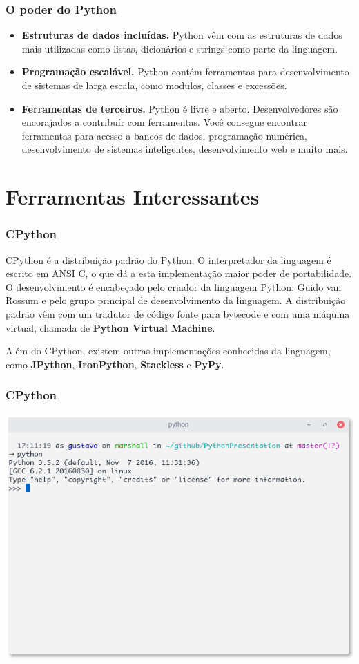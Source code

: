 \documentclass[aspectratio=169]{beamer}
\begin{document}
\begin{frame}
    \frametitle{O poder do Python}
    \begin{itemize}
        \item \textbf{Estruturas de dados incluídas.} Python vêm com as estruturas de
dados mais utilizadas como listas, dicionários e strings como parte da linguagem.
        \item \textbf{Programação escalável.} Python contém ferramentas para desenvolvimento
de sistemas de larga escala, como modulos, classes e excessões.
        \item \textbf{Ferramentas de terceiros.} Python é livre e aberto. Desenvolvedores
são encorajados a contribuír com ferramentas. Você consegue encontrar ferramentas para
acesso a bancos de dados, programação numérica, desenvolvimento de sistemas inteligentes,
desenvolvimento web e muito mais.
    \end{itemize}
\end{frame}


\section{Ferramentas Interessantes}

\begin{frame}
    \frametitle{CPython}
    CPython é a distribuição padrão do Python. O interpretador da linguagem é escrito
em ANSI C, o que dá a esta implementação maior poder de portabilidade. O desenvolvimento
é encabeçado pelo criador da linguagem Python:
Guido van Rossum e pelo grupo principal de desenvolvimento da linguagem. A distribuição padrão vêm com
um tradutor de código fonte para bytecode e com uma máquina virtual, chamada de \textbf{Python Virtual Machine}.

	Além do CPython, existem outras implementações conhecidas da linguagem, como
\textbf{JPython}, \textbf{IronPython}, \textbf{Stackless} e \textbf{PyPy}.
\end{frame}

\begin{frame}[fragile]
    \frametitle{CPython}
	\includegraphics[scale=0.45]{python_imgs/console_python}
\end{frame}
\end{document}
